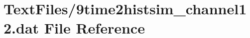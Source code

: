 \hypertarget{9time2histsim__channel12_8dat}{}\section{Text\+Files/9time2histsim\+\_\+channel12.dat File Reference}
\label{9time2histsim__channel12_8dat}
